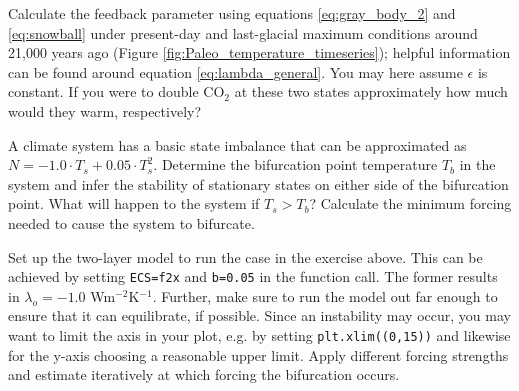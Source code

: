 \documentclass[12pt]{book}
\begin{document}
\newpage
\vspace{1 cm}
{\setlength{\parindent}{0cm}

\begin{exercise}
Calculate the feedback parameter using equations \ref{eq:gray_body_2} and \ref{eq:snowball} under present-day and last-glacial maximum conditions around 21,000 years ago (Figure \ref{fig:Paleo_temperature_timeseries}); helpful information can be found around equation \ref{eq:lambda_general}. You may here assume $\epsilon$ is constant. If you were to double CO$_2$ at these two states approximately how much would they warm, respectively? %
\end{exercise}

\begin{exercise}
A climate system has a basic state imbalance that can be approximated as $N=-1.0\cdot T_s + 0.05\cdot T_s^2$. Determine the bifurcation point temperature $T_b$ in the system and infer the stability of stationary states on either side of the bifurcation point. What will happen to the system if $T_s>T_b$?
Calculate the minimum forcing needed to cause the system to bifurcate. 
\end{exercise}

\begin{exercise}
Set up the two-layer model to run the case in the exercise above. This can be achieved by setting \verb|ECS=f2x| and \verb|b=0.05| in the function call. The former results in $\lambda_o=-1.0$ Wm$^{-2}$K$^{-1}$. Further, make sure to run the model out far enough to ensure that it can equilibrate, if possible. Since an instability may occur, you may want to limit the axis in your plot, e.g. by setting \verb|plt.xlim((0,15))| and likewise for the y-axis choosing a reasonable upper limit. 
Apply different forcing strengths and estimate iteratively at which forcing the bifurcation occurs. 
\end{exercise}
}


\end{document}
